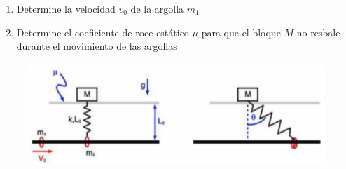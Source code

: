 \documentclass[letterpaper,11pt]{article}
\begin{document}
\begin{enumerate}
\begin{multicols}{2}
    \begin{enumerate}
        \item Determine la velocidad $v_0$ de la argolla $m_1$
        \item Determine el coeficiente de roce estático $\mu$ para que el bloque $M$ no resbale durante el movimiento de las argollas 
    \end{enumerate}
    \columnbreak
    \begin{figure}[H]
        \centering
        \includegraphics[width=0.8\linewidth]{2021-2/img/aux11/aa.PNG}
    \end{figure}
\end{multicols}
%   

\end{enumerate}
\end{document}
